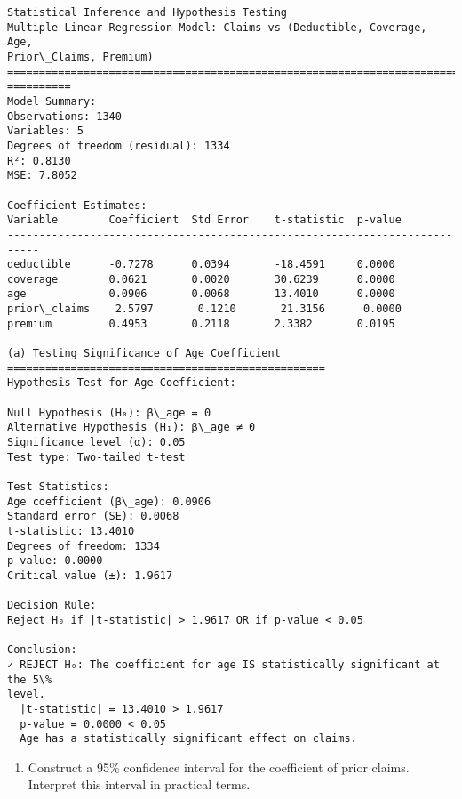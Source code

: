 \documentclass[8pt, twocolumn]{extarticle}
\providecommand{\tightlist}{%
      \setlength{\itemsep}{0pt}\setlength{\parskip}{0pt}}
\begin{document}
    \begin{Verbatim}[commandchars=\\\{\}]
Statistical Inference and Hypothesis Testing
Multiple Linear Regression Model: Claims vs (Deductible, Coverage, Age,
Prior\_Claims, Premium)
================================================================================
==========
Model Summary:
Observations: 1340
Variables: 5
Degrees of freedom (residual): 1334
R²: 0.8130
MSE: 7.8052

Coefficient Estimates:
Variable        Coefficient  Std Error    t-statistic  p-value
---------------------------------------------------------------------------
deductible      -0.7278      0.0394       -18.4591     0.0000
coverage        0.0621       0.0020       30.6239      0.0000
age             0.0906       0.0068       13.4010      0.0000
prior\_claims    2.5797       0.1210       21.3156      0.0000
premium         0.4953       0.2118       2.3382       0.0195

(a) Testing Significance of Age Coefficient
==================================================
Hypothesis Test for Age Coefficient:

Null Hypothesis (H₀): β\_age = 0
Alternative Hypothesis (H₁): β\_age ≠ 0
Significance level (α): 0.05
Test type: Two-tailed t-test

Test Statistics:
Age coefficient (β\_age): 0.0906
Standard error (SE): 0.0068
t-statistic: 13.4010
Degrees of freedom: 1334
p-value: 0.0000
Critical value (±): 1.9617

Decision Rule:
Reject H₀ if |t-statistic| > 1.9617 OR if p-value < 0.05

Conclusion:
✓ REJECT H₀: The coefficient for age IS statistically significant at the 5\%
level.
  |t-statistic| = 13.4010 > 1.9617
  p-value = 0.0000 < 0.05
  Age has a statistically significant effect on claims.
    \end{Verbatim}

    \begin{enumerate}
\def\labelenumi{(\alph{enumi})}
\setcounter{enumi}{1}
\tightlist
\item
  Construct a 95\% confidence interval for the coefficient of prior
  claims. Interpret this interval in practical terms.
\end{enumerate}
\end{document}
